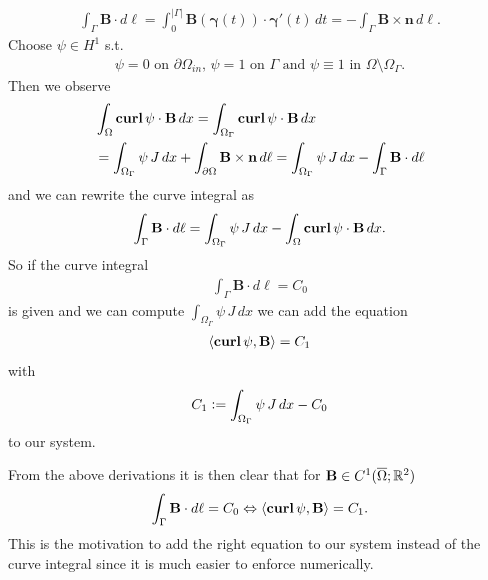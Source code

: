 \documentclass[../master_thesis.tex]{subfiles}
\begin{document}
\begin{align*}
    \int_\Gamma \mathbf{B}\cdot d\ell= \int_0^{|\Gamma|} \mathbf{B}(\bm{\gamma}(t)) \cdot \bm{\gamma}'(t) \, dt 
    = -\int_\Gamma  \mathbf{B}\times \mathbf{n} \,d\ell.
\end{align*}
Choose $\psi \in H^1$ s.t. 
\begin{align}
    \text{$\psi = 0$ on $\partial \Omega_{in}$, $\psi = 1$ on 
    $\Gamma$ and $\psi \equiv 1$ in $\Omega \setminus \Omega_\Gamma$}.\label{eq:conditions_psi}
\end{align}
Then we observe 
\begin{align*}
    &\int_\Omega \veccurl \psi \cdot \mathbf{B} \, dx = 
    \int_{\Omega_\Gamma} \veccurl \psi \cdot \mathbf{B} \, dx 
    \\ &= \int_{\Omega_\Gamma} \psi \, J \, dx + \int_{\partial\Omega} \mathbf{B} \times \mathbf{n}\, d\ell
    = \int_{\Omega_\Gamma} \psi \, J \, dx - \int_\Gamma \mathbf{B}\cdot d\ell
\end{align*}
and we can rewrite the curve integral as 
\begin{align}
    \int_\Gamma \mathbf{B} \cdot d\ell = \int_{\Omega_\Gamma} \psi \, J \, dx - 
        \int_\Omega \veccurl \psi \cdot \mathbf{B} \, dx. \label{eq:rewrite_curve_integral_differentiable}
\end{align}
So if the curve integral 
\begin{align*}
    \int_\Gamma \mathbf{B} \cdot d\ell = C_0
\end{align*}
is given and we can compute $\int_{\Omega_\Gamma} \psi \, J \, dx$
we can add the equation
\begin{align}
    \langle \veccurl \psi, \mathbf{B} \rangle = C_1 \label{eq:variational_curve_integral}
\end{align}
with 
\begin{align*}
    C_1 \vcentcolon= \int_{\Omega_\Gamma} \psi \, J \, dx - C_0
\end{align*}
to our system.

From the above derivations it is then clear that for $\mathbf{B} \in C^1(\overline{\Omega};\real^2)$
\begin{align*}
    \int_\Gamma \mathbf{B} \cdot d\ell = C_0 
    \Leftrightarrow \langle \veccurl \psi, \mathbf{B} \rangle = C_1.
\end{align*}
This is the motivation to add the right equation to our system instead
of the curve integral since it is much easier 
to enforce numerically.
\end{document}

